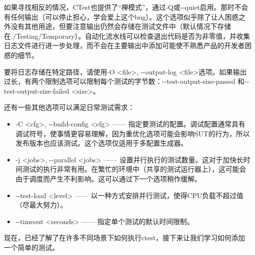 如果寻找相反的情况，CTest也提供了“禅模式”，通过-Q或-{}-quiet启用。那时不会有任何输出（可以停止担心，学会爱上这个bug）。这个选项似乎除了让人困惑之外没有其他用途，但要注意输出仍然会存储在测试文件中（默认情况下存储在./Testing/Temporary）。自动化流水线可以检查退出代码是否为非零值，并收集日志文件进行进一步处理，而不会在主要输出中添加可能使不熟悉产品的开发者困惑的细节。

要将日志存储在特定路径，请使用-O <file>, -{}-output-log <file>选项。如果输出过长，有两个限制选项可以限制每个测试的字节数：-{}-test-output-size-passed 和-{}-test-output-size-failed <size>。


还有一些其他选项可以满足日常测试需求：

\begin{itemize}
\item
-C <cfg>, -{}-build-config <cfg> —— 指定要测试的配置。调试配置通常具有调试符号，使事情更容易理解，因为重优化选项可能会影响SUT的行为，所以发布版本也应该测试。这个选项仅适用于多配置生成器。

\item
-j <jobs>, -{}-parallel <jobs> —— 设置并行执行的测试数量。这对于加快长时间测试的执行非常有用。在繁忙的环境中（共享的测试运行器上），这可能会由于调度而产生不利影响。这可以通过下一个选项稍作缓解。

\item
-{}-test-load <level> —— 以一种方式安排并行测试，使得CPU负载不超过值（尽最大努力）。

\item
-{}-timeout <seconds> —— 指定单个测试的默认时间限制。
\end{itemize}

现在，已经了解了在许多不同场景下如何执行ctest，接下来让我们学习如何添加一个简单的测试。



